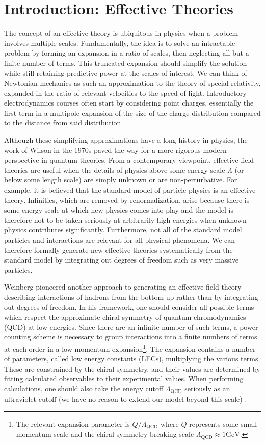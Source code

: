 \chapter{\label{chap:Introduction}Introduction: Effective Theories}

The concept of an effective theory is ubiquitous in physics when a problem involves multiple scales. Fundamentally, the idea is to solve an intractable problem by forming an expansion in a ratio of scales, then neglecting all but a finite number of terms. This truncated expansion should simplify the solution while still retaining predictive power at the scales of interest. We can think of Newtonian mechanics as such an approximation to the theory of special relativity, expanded in the ratio of relevant velocities to the speed of light. Introductory electrodynamics courses often start by considering point charges, essentially the first term in a multipole expansion of the size of the charge distribution compared to the distance from said distribution.

Although these simplifying approximations have a long history in physics,  the work of Wilson \cite{Wilson197475} in the 1970s paved the way for a more rigorous modern perspective in quantum theories. From a contemporary viewpoint, effective field theories are useful when the details of physics above some energy scale $\Lambda$ (or below some length scale) are simply unknown or are non-perturbative. For example, it is believed that the standard model of particle physics is an effective theory. Infinities, which are removed by renormalization, arise because there is some energy scale at which new physics comes into play and the model is therefore not to be taken seriously at arbitrarily high energies when unknown physics contributes significantly. Furthermore, not all of the standard model particles and interactions are relevant for all physical phenomena. We can therefore formally generate new effective theories systematically from the standard model by integrating out degrees of freedom such as very massive particles. 

Weinberg pioneered another approach to generating an effective field theory describing interactions of hadrons \cite{WEINBERG1990288} from the bottom up rather than by integrating out degrees of freedom. In his framework, one should consider all possible terms which respect the approximate chiral symmetry of quantum chromodynamics (QCD) at low energies. Since there are an infinite number of such terms, a power counting scheme is necessary to group interactions into a finite numbers of terms at each order in a low-momentum expansion\footnote{The relevant expansion parameter is $Q/\Lambda_{\text{QCD}}$ where $Q$ represents some small momentum scale and the chiral symmetry breaking scale $\Lambda_{\text{QCD}}\approx 1\text{GeV}$.}. The expansion contains a number of parameters, called low energy constants (LECs), multiplying the various terms. These are constrained by the chiral symmetry, and their values are determined by fitting calculated observables to their experimental values. When performing calculations, one should also take the energy cutoff $\Lambda_{\text{QCD}}$ seriously as an ultraviolet cutoff (we have no reason to extend our model beyond this scale) \cite{Epelbaum2013}. 

